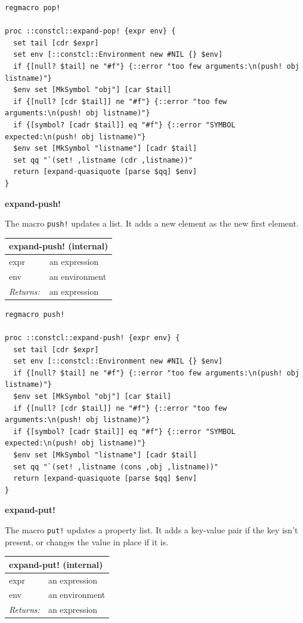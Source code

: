 \documentclass[twoside,9pt]{report}
\begin{document}
\noindent\makebox[\linewidth]{\rule{\linewidth}{0.4pt}}
\begin{lstlisting}
regmacro pop!
 
proc ::constcl::expand-pop! {expr env} {
  set tail [cdr $expr]
  set env [::constcl::Environment new #NIL {} $env]
  if {[null? $tail] ne "#f"} {::error "too few arguments:\n(push! obj listname)"}
  $env set [MkSymbol "obj"] [car $tail]
  if {[null? [cdr $tail]] ne "#f"} {::error "too few arguments:\n(push! obj listname)"}
  if {[symbol? [cadr $tail]] eq "#f"} {::error "SYMBOL expected:\n(push! obj listname)"}
  $env set [MkSymbol "listname"] [cadr $tail]
  set qq "`(set! ,listname (cdr ,listname))"
  return [expand-quasiquote [parse $qq] $env]
}
\end{lstlisting}
\noindent\makebox[\linewidth]{\rule{\linewidth}{0.4pt}}

\textbf{expand-push!}


The macro \texttt{push!} updates a list. It adds a new element as the new first element.

\begin{tabular}{ |l l| }
\hline
\multicolumn{2}{|l|}{expand-push! (internal)} \\
\hline
expr & an expression \\
env & an environment \\
\textit{Returns:} & an expression \\
\hline
\end{tabular}

\noindent\makebox[\linewidth]{\rule{\linewidth}{0.4pt}}
\begin{lstlisting}
regmacro push!
 
proc ::constcl::expand-push! {expr env} {
  set tail [cdr $expr]
  set env [::constcl::Environment new #NIL {} $env]
  if {[null? $tail] ne "#f"} {::error "too few arguments:\n(push! obj listname)"}
  $env set [MkSymbol "obj"] [car $tail]
  if {[null? [cdr $tail]] ne "#f"} {::error "too few arguments:\n(push! obj listname)"}
  if {[symbol? [cadr $tail]] eq "#f"} {::error "SYMBOL expected:\n(push! obj listname)"}
  $env set [MkSymbol "listname"] [cadr $tail]
  set qq "`(set! ,listname (cons ,obj ,listname))"
  return [expand-quasiquote [parse $qq] $env]
}
\end{lstlisting}
\noindent\makebox[\linewidth]{\rule{\linewidth}{0.4pt}}

\textbf{expand-put!}


The macro \texttt{put!} updates a property list. It adds a key-value pair if the key isn't present, or changes the value in place if it is.

\begin{tabular}{ |l l| }
\hline
\multicolumn{2}{|l|}{expand-put! (internal)} \\
\hline
expr & an expression \\
env & an environment \\
\textit{Returns:} & an expression \\
\hline
\end{tabular}
\end{document}
